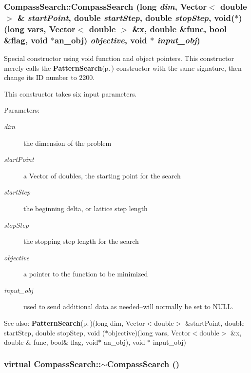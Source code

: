 \subsubsection{\setlength{\rightskip}{0pt plus 5cm}Compass\-Search::Compass\-Search (long {\em dim}, Vector$<$ double $>$ \& {\em start\-Point}, double {\em start\-Step}, double {\em stop\-Step}, void($\ast$)(long vars, Vector$<$ double $>$ \&x, double \&func, bool \&flag, void $\ast$an\_\-obj) {\em objective}, void $\ast$ {\em input\_\-obj})}\label{classCompassSearch_z3_1}


Special constructor using void function and object pointers. This constructor merely calls the {\bf Pattern\-Search}{\rm (p.\,\pageref{classPatternSearch})} constructor with the same signature, then change its ID number to 2200.

This constructor takes six input parameters. \begin{Desc}
\item[Parameters:]
\begin{description}
\item[{\em dim}]the dimension of the problem \item[{\em start\-Point}]a Vector of doubles, the starting point for the search \item[{\em start\-Step}]the beginning delta, or lattice step length \item[{\em stop\-Step}]the stopping step length for the search \item[{\em objective}]a pointer to the function to be minimized \item[{\em input\_\-obj}]used to send additional data as needed--will normally be set to NULL. \end{description}
\end{Desc}
\begin{Desc}
\item[See also:]{\bf Pattern\-Search}{\rm (p.\,\pageref{classPatternSearch})}(long dim, Vector$<$double$>$ \&start\-Point, double start\-Step, double stop\-Step, void ($\ast$objective)(long vars, Vector$<$double$>$ \&x, double \& func, bool\& flag, void$\ast$ an\_\-obj), void $\ast$ input\_\-obj) \end{Desc}
\subsubsection{\setlength{\rightskip}{0pt plus 5cm}virtual Compass\-Search::$\sim${\bf Compass\-Search} ()\hspace{0.3cm}{\tt  [virtual]}}\label{classCompassSearch_z3_2}


